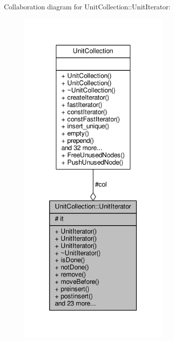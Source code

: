 Collaboration diagram for Unit\+Collection\+:\+:Unit\+Iterator\+:
\nopagebreak
\begin{figure}[H]
\begin{center}
\leavevmode
\includegraphics[width=213pt]{da/d24/classUnitCollection_1_1UnitIterator__coll__graph}
\end{center}
\end{figure}
